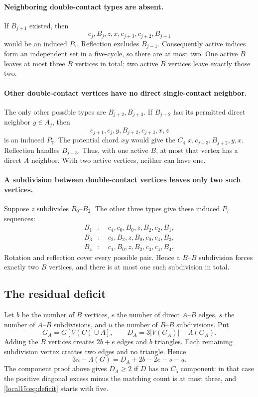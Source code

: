 \documentclass[11pt,a4paper]{article}
\theoremstyle{definition}\newtheorem{definition}[theorem]{Definition}
\theoremstyle{remark}\newtheorem{remark}[theorem]{Remark}
\begin{document}
\paragraph{Neighboring double-contact types are absent.}
If $B_{j+1}$ existed, then
\[
 c_j,B_j,z,x,c_{j+3},c_{j+2},B_{j+1}
\]
would be an induced $P_7$. Reflection excludes $B_{j-1}$. Consequently
active indices form an independent set in a five-cycle, so there are at
most two. One active $B$ leaves at most three $B$ vertices in total;
two active $B$ vertices leave exactly those two.

\paragraph{Other double-contact vertices have no direct single-contact neighbor.}
The only other possible types are $B_{j+2},B_{j+3}$. If $B_{j+2}$ has its
permitted direct neighbor $y\in A_j$, then
\[
 c_{j+1},c_j,y,B_{j+2},c_{j+3},x,z
\]
is an induced $P_7$. The potential chord $xy$ would give the $C_4$
$x,c_{j+3},B_{j+2},y,x$. Reflection handles $B_{j+3}$. Thus, with one
active $B$, at most that vertex has a direct $A$ neighbor. With two active
vertices, neither can have one.

\paragraph{A subdivision between double-contact vertices leaves only two such vertices.}
Suppose $z$ subdivides $B_0$--$B_2$. The other three types give these
induced $P_7$ sequences:
\begin{align*}
 B_1 &: \quad c_4,c_0,B_0,z,B_2,c_2,B_1,\\
 B_3 &: \quad c_2,B_2,z,B_0,c_0,c_4,B_3,\\
 B_4 &: \quad c_1,B_0,z,B_2,c_3,c_4,B_4.
\end{align*}
Rotation and reflection cover every possible pair. Hence a $B$--$B$
subdivision forces exactly two $B$ vertices, and there is at most one
such subdivision in total.

\subsection{The residual deficit}
Let $b$ be the number of $B$ vertices, $e$ the number of direct $A$--$B$
edges, $s$ the number of $A$--$B$ subdivisions, and $u$ the number of
$B$--$B$ subdivisions. Put
\[
 G_A=G[V(C)\cup A],\qquad D_A=3|V(G_A)|-\Lambda(G_A).
\]
Adding the $B$ vertices creates $2b+e$ edges and $b$ triangles. Each
remaining subdivision vertex creates two edges and no triangle. Hence
\begin{equation}\label{local15:eq:residual}
 3n-\Lambda(G)=D_A+2b-2e-s-u.
\end{equation}
The component proof above gives $D_A\ge2$ if $D$ has no $C_5$ component:
in that case the positive diagonal excess minus the matching count is
at most three, and \eqref{local15:eq:deficit} starts with five.
\end{document}
